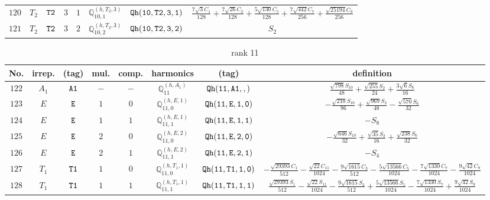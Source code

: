\documentclass[fleqn,8pt]{jsarticle}
\begin{document}
\begin{table}[ht!]
\begin{center}
\begin{tabular}{cccccccc}
$ 120 $ & $ T_{2} $ & $ {\tt T2} $ & $ 3 $ & $ 1 $ & $ \mathbb{Q}_{10,1}^{(h,T_{2},3)} $ & $ {\tt Qh(10,T2,3,1)} $ & $ \frac{7 \sqrt{3} C_{1}}{128} + \frac{7 \sqrt{26} C_{3}}{128} + \frac{5 \sqrt{130} C_{5}}{128} + \frac{7 \sqrt{442} C_{7}}{256} + \frac{\sqrt{25194} C_{9}}{256} $ \\
$ 121 $ & $ T_{2} $ & $ {\tt T2} $ & $ 3 $ & $ 2 $ & $ \mathbb{Q}_{10,2}^{(h,T_{2},3)} $ & $ {\tt Qh(10,T2,3,2)} $ & $ S_{2} $ \\
 \hline \hline
\end{tabular}
\end{center}
\end{table}
\begin{table}[ht!]
\begin{center}
\caption{rank 11}
\renewcommand{\arraystretch}{1.3}
\begin{tabular}{cccccccc} \hline \hline
No. & irrep. & (tag) & mul. & comp. & harmonics & (tag) & definition \\ \hline
$ 122 $ & $ A_{1} $ & $ {\tt A1} $ & $ - $ & $ - $ & $ \mathbb{Q}_{11}^{(h,A_{1})} $ & $ {\tt Qh(11,A1,,)} $ & $ \frac{\sqrt{798} S_{10}}{48} + \frac{\sqrt{255} S_{2}}{24} + \frac{3 \sqrt{6} S_{6}}{16} $ \\
$ 123 $ & $ E $ & $ {\tt E} $ & $ 1 $ & $ 0 $ & $ \mathbb{Q}_{11,0}^{(h,E,1)} $ & $ {\tt Qh(11,E,1,0)} $ & $ - \frac{\sqrt{210} S_{10}}{96} + \frac{\sqrt{969} S_{2}}{48} - \frac{\sqrt{570} S_{6}}{32} $ \\
$ 124 $ & $ E $ & $ {\tt E} $ & $ 1 $ & $ 1 $ & $ \mathbb{Q}_{11,1}^{(h,E,1)} $ & $ {\tt Qh(11,E,1,1)} $ & $ - S_{8} $ \\
$ 125 $ & $ E $ & $ {\tt E} $ & $ 2 $ & $ 0 $ & $ \mathbb{Q}_{11,0}^{(h,E,2)} $ & $ {\tt Qh(11,E,2,0)} $ & $ - \frac{\sqrt{646} S_{10}}{32} + \frac{\sqrt{35} S_{2}}{16} + \frac{\sqrt{238} S_{6}}{32} $ \\
$ 126 $ & $ E $ & $ {\tt E} $ & $ 2 $ & $ 1 $ & $ \mathbb{Q}_{11,1}^{(h,E,2)} $ & $ {\tt Qh(11,E,2,1)} $ & $ - S_{4} $ \\
$ 127 $ & $ T_{1} $ & $ {\tt T1} $ & $ 1 $ & $ 0 $ & $ \mathbb{Q}_{11,0}^{(h,T_{1},1)} $ & $ {\tt Qh(11,T1,1,0)} $ & $ - \frac{\sqrt{29393} C_{1}}{512} - \frac{\sqrt{22} C_{11}}{1024} - \frac{9 \sqrt{1615} C_{3}}{512} - \frac{5 \sqrt{13566} C_{5}}{1024} - \frac{7 \sqrt{1330} C_{7}}{1024} - \frac{9 \sqrt{42} C_{9}}{1024} $ \\
$ 128 $ & $ T_{1} $ & $ {\tt T1} $ & $ 1 $ & $ 1 $ & $ \mathbb{Q}_{11,1}^{(h,T_{1},1)} $ & $ {\tt Qh(11,T1,1,1)} $ & $ \frac{\sqrt{29393} S_{1}}{512} - \frac{\sqrt{22} S_{11}}{1024} - \frac{9 \sqrt{1615} S_{3}}{512} + \frac{5 \sqrt{13566} S_{5}}{1024} - \frac{7 \sqrt{1330} S_{7}}{1024} + \frac{9 \sqrt{42} S_{9}}{1024} $ \\

\end{tabular}
\end{center}
\end{table}
\end{document}

